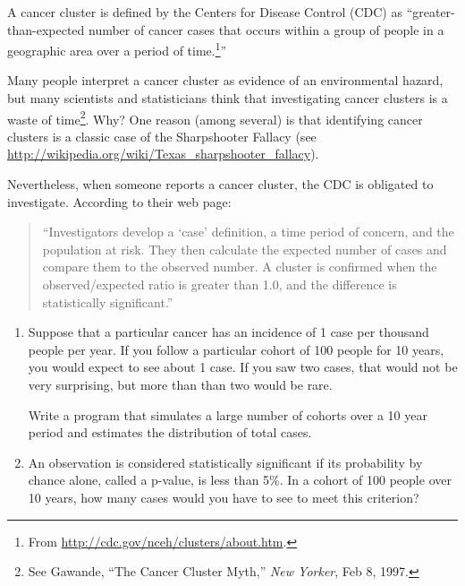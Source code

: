 \documentclass[12pt]{book}
\begin{document}
\begin{exercise}
A cancer cluster is defined by the Centers for Disease Control (CDC)
as ``greater-than-expected number of cancer cases that occurs within a
group of people in a geographic area over a period of
time.\footnote{From \url{http://cdc.gov/nceh/clusters/about.htm}.}''

Many people interpret a cancer cluster as evidence of an environmental
hazard, but many scientists and statisticians think that investigating
cancer clusters is a waste of time\footnote{See Gawande, ``The Cancer
  Cluster Myth,'' {\em New Yorker}, Feb 8, 1997.}.  Why?  One reason
(among several) is that identifying cancer clusters is a classic case
of the Sharpshooter Fallacy (see
\url{http://wikipedia.org/wiki/Texas_sharpshooter_fallacy}).

Nevertheless, when someone reports a cancer cluster, the CDC is
obligated to investigate.  According to their web page:

\begin{quote}

``Investigators develop a `case' definition, a time period of concern,
  and the population at risk. They then calculate the expected number
  of cases and compare them to the observed number. A cluster is
  confirmed when the observed/expected ratio is greater than 1.0, and
  the difference is statistically significant.''

\end{quote}

\begin{enumerate}

\item Suppose that a particular cancer has an incidence of 1 case per
  thousand people per year.  If you follow a particular cohort of 100
  people for 10 years, you would expect to see about 1 case.  If you
  saw two cases, that would not be very surprising, but more than than
  two would be rare.

  Write a program that simulates a large number of cohorts over
  a 10 year period and estimates the distribution of total cases.

\item An observation is considered statistically significant if its
  probability by chance alone, called a p-value, is less than 5\%.
  In a cohort of 100 people over 10 years, how many cases would you
  have to see to meet this criterion?


\end{enumerate}
\end{exercise}
\end{document}
